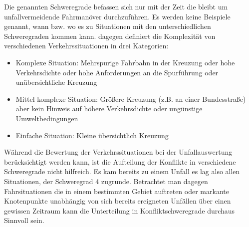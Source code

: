Die genannten Schweregrade befassen sich nur mit der Zeit die bleibt um unfallvermeidende Fahrmanöver durchzuführen. Es werden keine Beispiele genannt, wann bzw. wo es zu Situationen mit den unterschiedlichen Schweregraden kommen kann. \Textcite[S. 33f]{Meitinger.2008} dagegen definiert die Komplexität von verschiedenen Verkehrssituationen in drei Kategorien:

\begin{itemize}
	\item Komplexe Situation: Mehrspurige Fahrbahn in der Kreuzung oder hohe Verkehrsdichte oder hohe Anforderungen an die Spurführung oder unübersichtliche Kreuzung
	\item Mittel komplexe Situation: Größere Kreuzung (z.B. an einer Bundesstraße) aber kein Hinweis auf höhere Verkehrsdichte oder ungünstige Umweltbedingungen
	\item Einfache Situation: Kleine übersichtlich Kreuzung
\end{itemize}

Während die Bewertung der Verkehrssituationen bei der Unfallauswertung berücksichtigt werden kann, ist die Aufteilung der Konflikte in verschiedene Schweregrade nicht hilfreich. Es kam bereits zu einem Unfall es lag also allen Situationen, der Schweregrad 4 zugrunde. Betrachtet man dagegen Fahrsituationen die in einem bestimmten Gebiet auftreten oder markante Knotenpunkte unabhängig von sich bereits ereigneten Unfällen über einen gewissen Zeitraum kann die Unterteilung in Konfliktschweregrade durchaus Sinnvoll sein.


